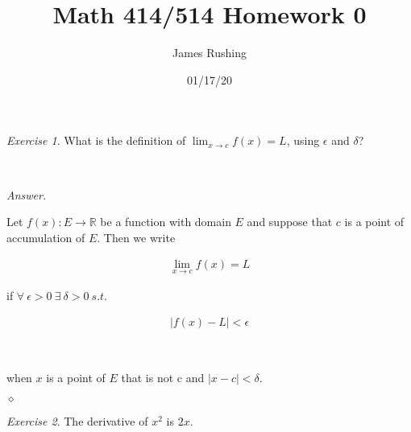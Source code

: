 \documentclass[12pt,oneside]{amsart}
\title{Math 414/514 Homework 0}
\author{James Rushing}
\date{01/17/20}
\theoremstyle{definition}
\theoremstyle{remark}
\newtheorem{exer}{Exercise}
\numberwithin{equation}{exer}
\newenvironment{answer}{\bigskip\noindent\emph{Answer.}}{\hfill$\diamond$\newline}
\begin{document}
\maketitle

\begin{exer}

What is the definition of $\lim_{x \to c} f(x) = L$, using $\epsilon$ and $\delta$?

\end{exer}



\




\begin{answer}

Let $f(x) : E \to \mathbb{R} $ be a function with domain $E$ and suppose that $c$ is a point of accumulation of $E$. Then we write

\begin{align*}
    \lim_{x \to c} f(x) = L
\end{align*}

if $\forall \:  \epsilon > 0 \: \exists\: \delta > 0\: s.t.$

\begin{align*}
    |f(x) - L| < \epsilon
\end{align*}

\

when $x$ is a point of $E$ that is not c and $|x-c| <\delta$.

\end{answer}


\newpage

\begin{exer}

The derivative of $x^2$ is $2x$.

\end{exer}
\end{document}

